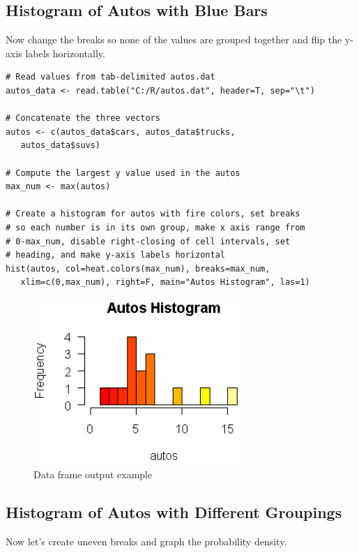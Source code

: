 \documentclass[10pt]{book}
\begin{document}
\subsection*{Histogram of Autos with Blue Bars}
Now change the breaks so none of the values are grouped together and flip the y-axis labels horizontally.

\begin{lstlisting}
# Read values from tab-delimited autos.dat
autos_data <- read.table("C:/R/autos.dat", header=T, sep="\t")

# Concatenate the three vectors
autos <- c(autos_data$cars, autos_data$trucks, 
   autos_data$suvs)

# Compute the largest y value used in the autos
max_num <- max(autos)

# Create a histogram for autos with fire colors, set breaks
# so each number is in its own group, make x axis range from
# 0-max_num, disable right-closing of cell intervals, set
# heading, and make y-axis labels horizontal
hist(autos, col=heat.colors(max_num), breaks=max_num, 
   xlim=c(0,max_num), right=F, main="Autos Histogram", las=1)
\end{lstlisting}
\begin{figure}[H]
    \begin{flushleft}
        \includegraphics[width=0.7\textwidth]{hist_script3.png}
        \caption{Data frame output example}
        \label{fig:dataframe}
    \end{flushleft}
\end{figure}

\subsection*{Histogram of Autos with Different Groupings}
Now let's create uneven breaks and graph the probability density.
\end{document}
